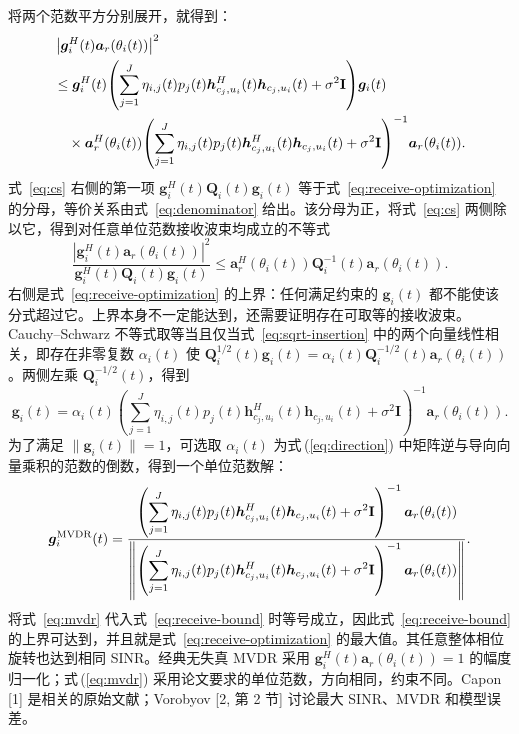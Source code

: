 \documentclass[11pt,a4paper]{ctexart}
\begin{document}
将两个范数平方分别展开，就得到：
\begin{align}
&\left|\bm g_i^H(t)\bm a_r(\theta_i(t))\right|^2\notag\\
&\le\bm g_i^H(t)\!\left(\sum_{j=1}^J\eta_{i,j}(t)p_j(t)
\bm h_{c_j,u_i}^{H}(t)\bm h_{c_j,u_i}(t)+\sigma^2\mathbf I\right)\!\bm g_i(t)\notag\\
&\quad\times\bm a_r^H(\theta_i(t))\!\left(\sum_{j=1}^J\eta_{i,j}(t)p_j(t)
\bm h_{c_j,u_i}^{H}(t)\bm h_{c_j,u_i}(t)+\sigma^2\mathbf I\right)^{-1}\!\bm a_r(\theta_i(t)).\label{eq:cs}
\end{align}
式~\eqref{eq:cs} 右侧的第一项 $\bm g_i^H(t)\mathbf Q_i(t)\bm g_i(t)$ 等于式~\eqref{eq:receive-optimization} 的分母，等价关系由式~\eqref{eq:denominator} 给出。该分母为正，将式~\eqref{eq:cs} 两侧除以它，得到对任意单位范数接收波束均成立的不等式
\begin{equation}\label{eq:receive-bound}
\frac{|\bm g_i^H(t)\bm a_r(\theta_i(t))|^2}{\bm g_i^H(t)\mathbf Q_i(t)\bm g_i(t)}
\le\bm a_r^H(\theta_i(t))\mathbf Q_i^{-1}(t)\bm a_r(\theta_i(t)).
\end{equation}
右侧是式~\eqref{eq:receive-optimization} 的上界：任何满足约束的 $\bm g_i(t)$ 都不能使该分式超过它。上界本身不一定能达到，还需要证明存在可取等的接收波束。Cauchy--Schwarz 不等式取等当且仅当式~\eqref{eq:sqrt-insertion} 中的两个向量线性相关，即存在非零复数 $\alpha_i(t)$ 使 $\mathbf Q_i^{1/2}(t)\bm g_i(t)=\alpha_i(t)\mathbf Q_i^{-1/2}(t)\bm a_r(\theta_i(t))$。两侧左乘 $\mathbf Q_i^{-1/2}(t)$，得到
\begin{equation}\label{eq:direction}
\bm g_i(t)=\alpha_i(t)\left(\sum_{j=1}^J\eta_{i,j}(t)p_j(t)
\bm h_{c_j,u_i}^{H}(t)\bm h_{c_j,u_i}(t)+\sigma^2\mathbf I\right)^{-1}
\bm a_r(\theta_i(t)).
\end{equation}
为了满足 $\|\bm g_i(t)\|=1$，可选取 $\alpha_i(t)$ 为式\,(\ref{eq:direction}) 中矩阵逆与导向向量乘积的范数的倒数，得到一个单位范数解：
\begin{equation}\label{eq:mvdr}
\bm g_i^{\rm MVDR}(t)=
\frac{\left(\displaystyle\sum_{j=1}^J\eta_{i,j}(t)p_j(t)
\bm h_{c_j,u_i}^{H}(t)\bm h_{c_j,u_i}(t)+\sigma^2\mathbf I\right)^{-1}
\bm a_r(\theta_i(t))}
{\left\|\left(\displaystyle\sum_{j=1}^J\eta_{i,j}(t)p_j(t)
\bm h_{c_j,u_i}^{H}(t)\bm h_{c_j,u_i}(t)+\sigma^2\mathbf I\right)^{-1}
\bm a_r(\theta_i(t))\right\|}.
\end{equation}
将式~\eqref{eq:mvdr} 代入式~\eqref{eq:receive-bound} 时等号成立，因此式~\eqref{eq:receive-bound} 的上界可达到，并且就是式~\eqref{eq:receive-optimization} 的最大值。其任意整体相位旋转也达到相同 SINR。经典无失真 MVDR 采用 $\bm g_i^H(t)\bm a_r(\theta_i(t))=1$ 的幅度归一化；式\,(\ref{eq:mvdr}) 采用论文要求的单位范数，方向相同，约束不同。Capon [1] 是相关的原始文献；Vorobyov [2, 第 2 节] 讨论最大 SINR、MVDR 和模型误差。
\end{document}

